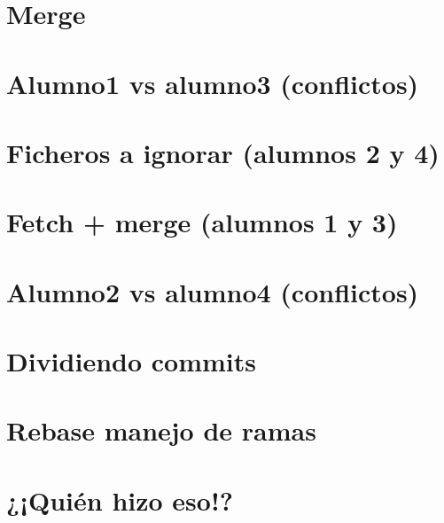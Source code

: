 \documentclass{article}
\begin{document}
\section{Merge}
\section{Alumno1 vs alumno3 (conflictos)}
\section{Ficheros a ignorar (alumnos 2 y 4)}
\section{Fetch + merge (alumnos 1 y 3)}
\section{Alumno2 vs alumno4 (conflictos)}
\section{Dividiendo commits}
\section{Rebase manejo de ramas}
\section{¿¡Quién hizo eso!?}
\end{document}

